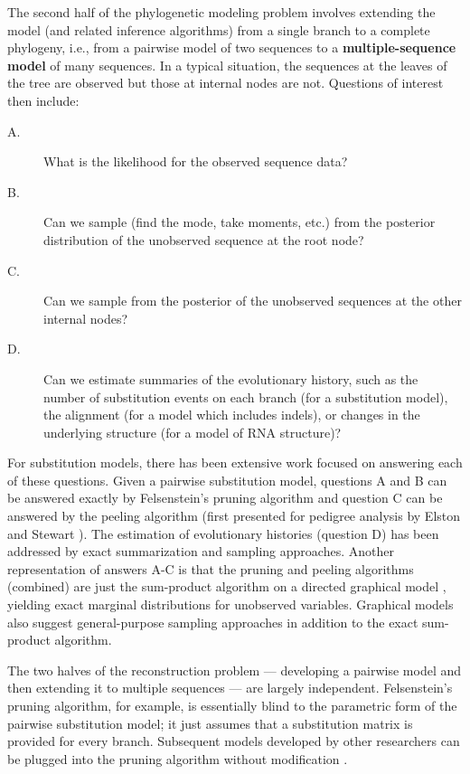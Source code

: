 \documentclass[10pt]{article}
\begin{document}
The second half of the phylogenetic modeling problem involves extending the model (and related inference algorithms) from a single branch to a complete phylogeny,
i.e., from a pairwise model of two sequences to a {\bf multiple-sequence model} of many sequences.
In a typical situation, the sequences at the leaves of the tree are
observed but those at internal nodes are not.
Questions of interest then include:
\begin{description}
\item[A.] What is the likelihood for the observed sequence data?
\item[B.] Can we sample (find the mode, take moments, etc.) from the posterior distribution of the unobserved sequence at the root node?
\item[C.] Can we sample from the posterior of the unobserved sequences at the other internal nodes?
\item[D.] Can we estimate summaries of the evolutionary history, such as
  the number of substitution events on each branch (for a substitution
  model), the alignment (for a model which includes indels), or
  changes in the underlying structure (for a model of RNA structure)?
\end{description}

For substitution models, there has been extensive work focused on answering each of these questions.
Given a pairwise substitution model, questions A and B can be
answered exactly by Felsenstein's pruning algorithm
\cite{Felsenstein81} and question C can be answered by the peeling
algorithm (first presented for pedigree analysis by Elston and Stewart \cite{ElstonStewart71}).
The estimation of evolutionary histories (question D) has been
addressed by exact summarization \cite{HolmesRubin2002b} and sampling
\cite{Nielsen2001} approaches.
Another representation of answers A-C
is that the pruning and peeling algorithms (combined) are just
the sum-product algorithm on a directed graphical model \cite{Pearl82},
yielding exact marginal distributions for unobserved variables.
Graphical models also suggest general-purpose sampling approaches
in addition to the exact sum-product algorithm.

The two halves of the reconstruction problem --- developing a pairwise model and then extending it to multiple sequences --- are largely independent.
Felsenstein's pruning algorithm, for example, is essentially blind to the parametric form of the pairwise substitution model;
it just assumes that a substitution matrix is provided for every branch.
Subsequent models developed by other researchers can be plugged into the pruning algorithm without modification \cite{Yang94b,WhelanGoldman2001}.
\end{document}
